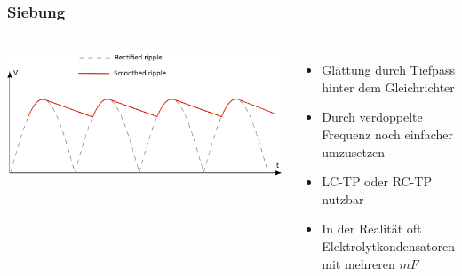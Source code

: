 \begin{frame}
  \frametitle{Siebung}
  \begin{columns}[c]
    \begin{center}
      \includegraphics[width=1\textwidth]{a05/Smoothed_ripple.png}\\
      \tiny \hyperlink{refs}{\cite{wm}}
    \end{center}
    \begin{itemize}
      \item Glättung durch Tiefpass hinter dem Gleichrichter
      \item Durch verdoppelte Frequenz noch einfacher umzusetzen
      \item LC-TP oder RC-TP nutzbar
      \item In der Realität oft Elektrolytkondensatoren mit mehreren $mF$
    \end{itemize}
  \end{columns}
\end{frame}


